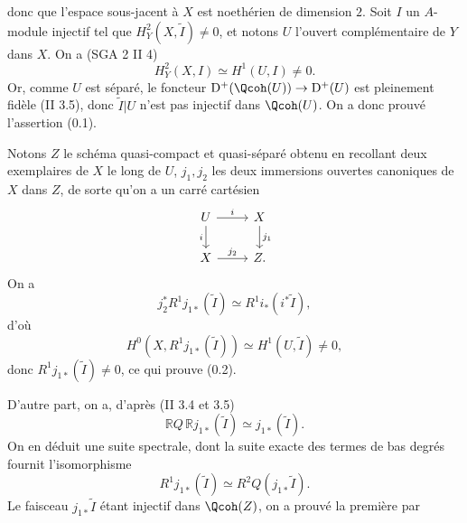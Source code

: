 donc que l'espace sous-jacent à $X$ est noethérien de dimension $2$. Soit $I$ un $A$-module injectif tel que $H^2_Y(X,\widetilde I)\ne0$, et notons $U$ l'ouvert complémentaire de $Y$ dans $X$. On a (SGA 2 II 4)
\[
 H^2_Y(X,I)\simeq H^1(U,I)\ne0.
\]
Or, comme $U$ est séparé, le foncteur $\mathrm D^+(\Qcoh(U))\to\mathrm D^+(U)$ est pleinement fidèle (II 3.5), donc $\widetilde I|U$ n'est pas injectif dans $\Qcoh(U)$. On a donc prouvé l'assertion (0.1).

Notons $Z$ le schéma quasi-compact et quasi-séparé obtenu en recollant deux exemplaires de $X$ le long de $U$, $j_1,j_2$ les deux immersions ouvertes canoniques de $X$ dans $Z$, de sorte qu'on a un carré cartésien
\[
\begin{tikzcd}
 U \arrow[r,"i"] \arrow[d,"i"'] & X \arrow[d,"j_1"]\\
 X \arrow[r,"j_2"] & Z .
\end{tikzcd}
\]
On a
\[
 j_2^*R^1j_{1*}(\widetilde I)\simeq R^1i_*(i^*\widetilde I),
\]
d'où
\[
 H^0(X,R^1j_{1*}(\widetilde I))\simeq H^1(U,\widetilde I)\ne0,
\]
donc $R^1j_{1*}(\widetilde I)\ne0$, ce qui prouve (0.2).

D'autre part, on a, d'après (II 3.4 et 3.5)
\[
 \mathbb RQ\,\mathbb Rj_{1*}(\widetilde I)\simeq j_{1*}(\widetilde I).
\]
On en déduit une suite spectrale, dont la suite exacte des termes de bas degrés fournit l'isomorphisme
\[
 R^1j_{1*}(\widetilde I)\simeq R^2Q(j_{1*}\widetilde I).
\]
Le faisceau $j_{1*}\widetilde I$ étant injectif dans $\Qcoh(Z)$, on a prouvé la première 
par%
